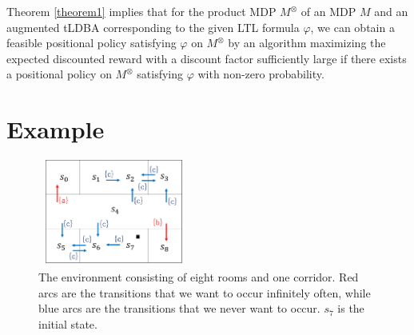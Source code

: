 \documentclass[letterpaper, 10 pt, conference]{ieeeconf}  %
\begin{document}
Theorem \ref{theorem1} implies that for the product MDP $M^{\otimes}$ of an MDP $M$ and an augmented tLDBA corresponding to the given LTL formula $\varphi$, we can obtain a feasible positional policy satisfying $\varphi$ on $M^{\otimes}$ by an algorithm maximizing the expected discounted reward with a discount factor sufficiently large if there exists a positional policy on $M^{\otimes}$ satisfying $\varphi$ with non-zero probability.


\section{Example}

\begin{figure}[bp]
    \centering
    \includegraphics[bb=0 0 377 290,height=3.5cm,width=5cm]{MDP_corridor.png}
    \caption{The environment consisting of eight rooms and one corridor. Red arcs are the transitions that we want to occur infinitely often, while blue arcs are the transitions that we never want to occur. $s_7$ is the initial state.}
    \label{Grid1}
\end{figure}
\end{document}
